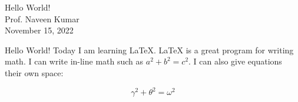 \documentclass{article}
\begin{document}
\begin{center}
Hello World! \\
Prof. Naveen Kumar \\
November 15, 2022 \\
\end{center}
Hello World! Today I am learning \LaTeX{}. \LaTeX{} is a great program for writing math. I can write in-line math such as $a^2 + b^2 = c^2$. I can also give equations their own space:

\[
\gamma^2 + \theta^2 = \omega^2
\]
\end{document}
